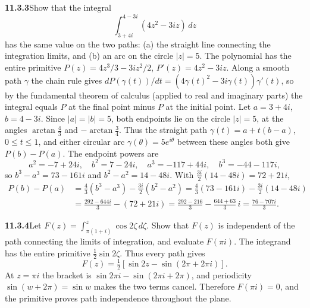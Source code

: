 \par\bigskip
\noindent\textbf{11.3.3}\quad Show that the integral
\[
\int_{3+4i}^{4-3i}(4z^{2}-3iz)\,dz
\]
has the same value on the two paths: (a) the straight line connecting the
integration limits, and (b) an arc on the circle $|z|=5$.
\solution
The polynomial has the entire primitive
$P(z)=4z^3/3-3iz^2/2$, $P'(z)=4z^2-3iz$. Along a smooth path
$\gamma$ the chain rule gives
$dP(\gamma(t))/dt=(4\gamma(t)^2-3i\gamma(t))\gamma'(t)$, so by the
fundamental theorem of calculus (applied to real and imaginary parts)
the integral equals $P$ at the final point minus $P$ at the initial
point. Let $a=3+4i$, $b=4-3i$. Since $|a|=|b|=5$, both endpoints lie
on the circle $|z|=5$, at the angles $\arctan\frac43$ and
$-\arctan\frac34$. Thus the straight path $\gamma(t)=a+t(b-a)$,
$0\le t\le1$, and either circular arc $\gamma(\theta)=5e^{i\theta}$
between these angles both give $P(b)-P(a)$.
The endpoint powers are
\[
a^2=-7+24i,\quad b^2=7-24i,\quad
a^3=-117+44i,\quad b^3=-44-117i,
\]
so $b^3-a^3=73-161i$ and $b^2-a^2=14-48i$. With
$\tfrac{3i}{2}(14-48i)=72+21i$,
\[
\begin{aligned}
P(b)-P(a)
&=\tfrac43(b^3-a^3)-\tfrac{3i}{2}(b^2-a^2)
=\tfrac43(73-161i)-\tfrac{3i}{2}(14-48i)\\
&=\frac{292-644i}{3}-(72+21i)
=\frac{292-216}{3}-\frac{644+63}{3}\,i
=\boxed{\frac{76-707i}{3}}.
\end{aligned}
\]

\par\bigskip
\noindent\textbf{11.3.4}\quad Let
$F(z)=\displaystyle\int_{\pi(1+i)}^{z}\cos2\zeta\,d\zeta$. Show that $F(z)$ is
independent of the path connecting the limits of integration, and evaluate
$F(\pi i)$.
\solution
The integrand has the entire primitive $\tfrac12\sin2\zeta$.
Thus every path gives
\[
F(z)=\tfrac12[\sin2z-\sin(2\pi+2\pi i)].
\]
At $z=\pi i$ the bracket is $\sin2\pi i-\sin(2\pi i+2\pi)$, and
periodicity $\sin(w+2\pi)=\sin w$ makes the two terms cancel.
Therefore $\boxed{F(\pi i)=0}$, and the
primitive proves path independence throughout the plane.


